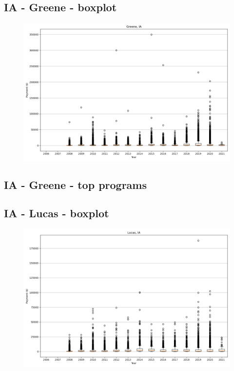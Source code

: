 \subsection*{IA - Greene - boxplot}
\begin{figure}[h]
\centering
\includegraphics[width=7in]{../output/boxplots/counties/Greene-IA_boxplot.png}
\end{figure}


\subsection*{IA - Greene - top programs}

\newpage
\subsection*{IA - Lucas - boxplot}
\begin{figure}[h]
\centering
\includegraphics[width=7in]{../output/boxplots/counties/Lucas-IA_boxplot.png}
\end{figure}



